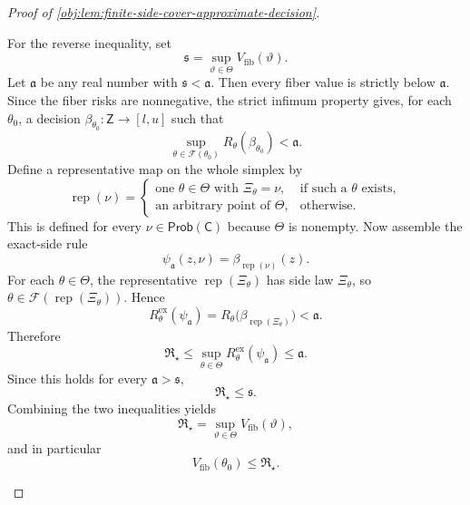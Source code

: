 \documentclass[11pt]{article}
\begin{document}
\begin{proof}[Proof of \cref{obj:lem:finite-side-cover-approximate-decision}]
\begin{enumerate}
For the reverse inequality, set
\[
\mathfrak s=\sup_{\vartheta\in\Theta}V_{\mathrm{fib}}(\vartheta).
\]
Let \(\mathfrak a\) be any real number with \(\mathfrak s<\mathfrak a\). Then every fiber value is strictly below \(\mathfrak a\). Since the fiber risks are nonnegative, the strict infimum property gives, for each \(\theta_0\), a decision \(\beta_{\theta_0}:\mathsf Z\to[l,u]\) such that
\[
\sup_{\theta\in\mathcal F(\theta_0)}R_\theta(\beta_{\theta_0})<\mathfrak a.
\]
Define a representative map on the whole simplex by
\[
\operatorname{rep}(\nu)=
\begin{cases}
\text{one }\theta\in\Theta\text{ with }\Xi_\theta=\nu, & \text{if such a }\theta\text{ exists},\\
\text{an arbitrary point of }\Theta, & \text{otherwise}.
\end{cases}
\]
This is defined for every \(\nu\in\mathsf{Prob}(\mathsf C)\) because \(\Theta\) is nonempty. Now assemble the exact-side rule
\[
\psi_{\mathfrak a}(z,\nu)=\beta_{\operatorname{rep}(\nu)}(z).
\]
For each \(\theta\in\Theta\), the representative \(\operatorname{rep}(\Xi_\theta)\) has side law \(\Xi_\theta\), so \(\theta\in\mathcal F(\operatorname{rep}(\Xi_\theta))\). Hence
\[
R^{\mathrm{ex}}_\theta(\psi_{\mathfrak a})
=
R_\theta\bigl(\beta_{\operatorname{rep}(\Xi_\theta)}\bigr)
<\mathfrak a.
\]
Therefore
\[
\mathfrak R_\star
\le
\sup_{\theta\in\Theta}R^{\mathrm{ex}}_\theta(\psi_{\mathfrak a})
\le \mathfrak a.
\]
Since this holds for every \(\mathfrak a>\mathfrak s\),
\[
\mathfrak R_\star\le\mathfrak s.
\]
Combining the two inequalities yields
\[
\mathfrak R_\star=\sup_{\vartheta\in\Theta}V_{\mathrm{fib}}(\vartheta),
\]
and in particular
\[
V_{\mathrm{fib}}(\theta_0)\le \mathfrak R_\star .
\]


\end{enumerate}
\end{proof}
\end{document}
